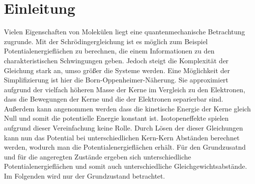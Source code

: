 \documentclass[a4paper]{scrartcl}
\begin{document}
\section{Einleitung}

Vielen Eigenschaften von Molekülen liegt eine quantenmechanische Betrachtung zugrunde. Mit der Schrödingergleichung ist es möglich zum Beispiel Potentialenergieflächen zu berechnen, die einem Informationen zu den charakteristischen Schwingungen  geben. Jedoch steigt die Komplexität der Gleichung stark an, umso größer die Systeme werden. Eine Möglichkeit der Simplifizierung ist hier die Born-Oppenheimer-Näherung. Sie approximiert aufgrund der vielfach höheren Masse der Kerne im Vergleich zu den Elektronen, dass die Bewegungen der Kerne und die der Elektronen separierbar sind. Außerdem kann angenommen werden dass die kinetische Energie der Kerne gleich Null und somit die potentielle Energie konstant ist. Isotopeneffekte spielen aufgrund dieser Vereinfachung keine Rolle.
Durch Lösen der dieser Gleichungen kann nun das Potential bei unterschiedlichen Kern-Kern Abständen berechnet werden, wodurch man die Potentialenergieflächen erhält.
Für den Grundzusatnd und für die angeregten Zustände ergeben sich unterschiedliche Potentialenergieflächen und somit auch unterschiedliche Gleichgewichtsabstände. Im Folgenden wird nur der Grundzustand betrachtet.
\end{document}
